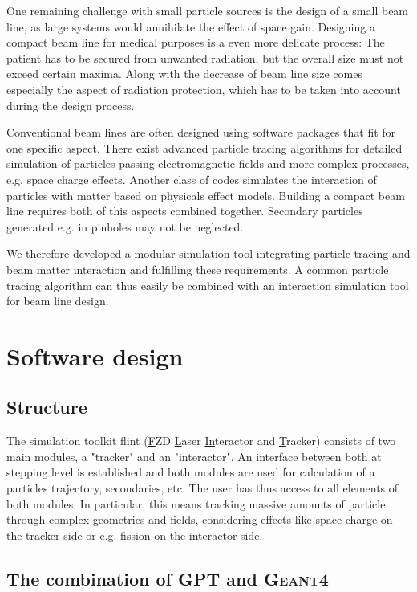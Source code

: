 \documentclass[3p, twocolumn, number, a4paper, 10pt, oneside, preprint]{elsarticle}
\newcommand{\geant}{\textsc{Geant4} }
\begin{document}
One remaining challenge with small particle sources is the design of a small beam line, as large systems would annihilate the effect of space gain. Designing a compact beam line for medical purposes is a even more delicate process: The patient has to be secured from unwanted radiation, but the overall size must not exceed certain maxima. Along with the decrease of beam line size comes especially the aspect of radiation protection, which has to be taken into account during the design process.

Conventional beam lines are often designed using software packages that fit for one specific aspect. There exist advanced particle tracing algorithms for detailed simulation of particles passing electromagnetic fields and more complex processes, e.g. space charge effects. Another class of codes simulates the interaction of particles with matter	 based on physicals effect models. Building a compact beam line requires both of this aspects combined together. Secondary particles generated e.g. in pinholes may not be neglected.

We therefore developed a modular simulation tool integrating particle tracing and beam matter interaction and fulfilling these requirements. A common particle tracing algorithm can thus easily be combined with an interaction simulation tool for beam line design.

\section{Software design}
\label{design}

\subsection{Structure}
\label{structure}

The simulation toolkit flint (\underline{F}ZD \underline{L}aser \underline{In}teractor and \underline{T}racker) consists of two main modules, a "tracker" and an "interactor". An interface between both at stepping level is established and both modules are used for calculation of a particles trajectory, secondaries, etc. The user has thus access to all elements of both modules. In particular, this means tracking massive amounts of particle through complex geometries and fields, considering effects like space charge on the tracker side or e.g. fission on the interactor side.

\subsection{The combination of GPT and \geant}
\label{combination}
\end{document}

